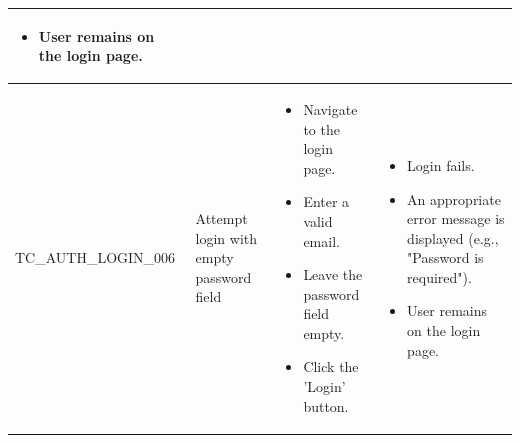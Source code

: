 \begin{longtable}{|>{\scriptsize\raggedright\arraybackslash}p{3.5cm}|>{\raggedright\arraybackslash}p{3.5cm}|>{\raggedright\arraybackslash}p{4cm}|>{\raggedright\arraybackslash}p{4cm}|}
\begin{itemize}[noitemsep, topsep=0pt, partopsep=0pt, leftmargin=*]
        \item User remains on the login page.
    \end{itemize} \\ \hline
TC\_AUTH\_LOGIN\_006 & Attempt login with empty password field & 
    \begin{itemize}[noitemsep, topsep=0pt, partopsep=0pt, leftmargin=*]
        \item Navigate to the login page.
        \item Enter a valid email. 
        \item Leave the password field empty. 
        \item Click the 'Login' button.
    \end{itemize} & 
    \begin{itemize}[noitemsep, topsep=0pt, partopsep=0pt, leftmargin=*]
        \item Login fails.
        \item An appropriate error message is displayed (e.g., "Password is required").
        \item User remains on the login page.
    \end{itemize} \\ \hline


\end{longtable}
